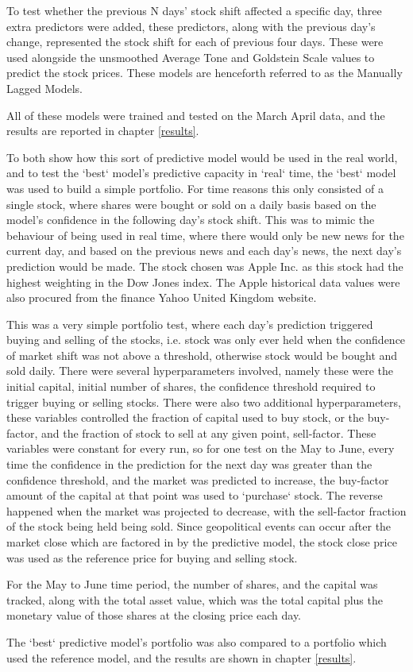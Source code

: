To test whether the previous N days' stock shift affected a specific day, three extra predictors were added, these predictors, along with the previous day's change, represented the stock shift for each of previous four days. These were used alongside the unsmoothed Average Tone and Goldstein Scale values to predict the stock prices. These models are henceforth referred to as the Manually Lagged Models.

All of these models were trained and tested on the March April data, and the results are reported in chapter \ref{results}.

To both show how this sort of predictive model would be used in the real world, and to test the `best` model's predictive capacity in `real` time, the `best` model was used to build a simple portfolio. For time reasons this only consisted of a single stock, where shares were bought or sold on a daily basis based on the model's confidence in the following day's stock shift. This was to mimic the behaviour of being used in real time, where there would only be new news for the current day, and based on the previous news and each day's news, the next day's prediction would be made. The stock chosen was Apple Inc. as this stock had the highest weighting in the Dow Jones index. The Apple historical data values were also procured from the finance Yahoo United Kingdom website. 

This was a very simple portfolio test, where each day's prediction triggered buying and selling of the stocks, i.e. stock was only ever held when the confidence of market shift was not above a threshold, otherwise stock would be bought and sold daily. There were several hyperparameters involved, namely these were the initial capital, initial number of shares, the confidence threshold required to trigger buying or selling stocks. There were also two additional hyperparameters, these variables controlled the fraction of capital used to buy stock, or the buy-factor, and the fraction of stock to sell at any given point, sell-factor. These variables were constant for every run, so for one test on the May to June, every time the confidence in the prediction for the next day was greater than the confidence threshold, and the market was predicted to increase, the buy-factor amount of the capital at that point was used to `purchase` stock. The reverse happened when the market was projected to decrease, with the sell-factor fraction of the stock being held being sold. Since geopolitical events can occur after the market close which are factored in by the predictive model, the stock close price was used as the reference price for buying and selling stock. 

For the May to June time period, the number of shares, and the capital was tracked, along with the total asset value, which was the total capital plus the monetary value of those shares at the closing price each day.

The `best` predictive model's portfolio was also compared to a portfolio which used the reference model, and the results are shown in chapter \ref{results}.
